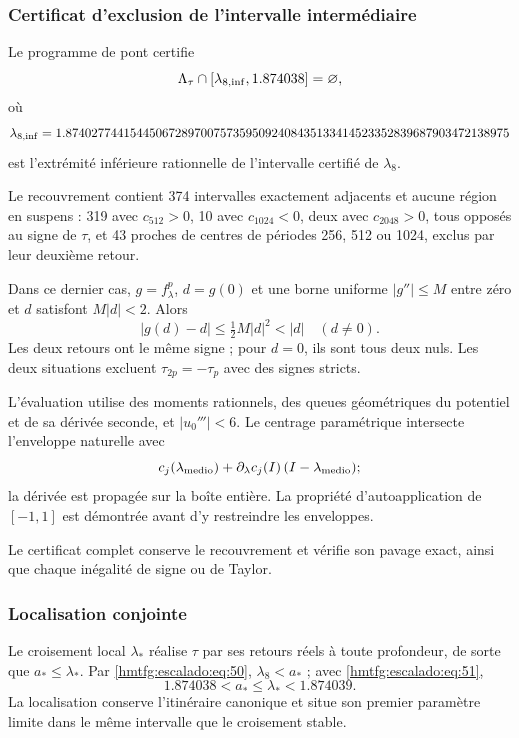 \subsubsection{Certificat d’exclusion de l’intervalle intermédiaire}
\label{hmtfg:escalado:15.3}

Le programme de pont certifie
\begin{equation}
\Lambda_\tau\cap[\lambda_{8,\rm inf},1.874038]=\varnothing,
\label{hmtfg:escalado:eq:51}
\end{equation}
où
\[
\lambda_{8,\rm inf}
=1.874027744154450672897007573595092408435133414523352839687903472138975
\]
est l’extrémité inférieure rationnelle de l’intervalle certifié de \(\lambda_8\).

Le recouvrement contient 374 intervalles exactement adjacents et aucune région en suspens : 319 avec \(c_{512}>0\), 10 avec \(c_{1024}<0\), deux avec \(c_{2048}>0\), tous opposés au signe de \(\tau\), et 43 proches de centres de périodes 256, 512 ou 1024, exclus par leur deuxième retour.

Dans ce dernier cas, \(g=f_\lambda^p\), \(d=g(0)\) et une borne uniforme \(|g''|\le M\) entre zéro et \(d\) satisfont \(M|d|<2\). Alors
\[
|g(d)-d|\le\tfrac12M|d|^2<|d|\quad(d\ne0).
\]
Les deux retours ont le même signe ; pour \(d=0\), ils sont tous deux nuls. Les deux situations excluent \(\tau_{2p}=-\tau_p\) avec des signes stricts.

L’évaluation utilise des moments rationnels, des queues géométriques du potentiel et de sa dérivée seconde, et \(|u_0'''|<6\). Le centrage paramétrique intersecte l’enveloppe naturelle avec
\[
c_j(\lambda_{\rm medio})+
\partial_\lambda c_j(I)\,(I-\lambda_{\rm medio});
\]
la dérivée est propagée sur la boîte entière. La propriété d’autoapplication de \([-1,1]\) est démontrée avant d’y restreindre les enveloppes.

Le certificat complet conserve le recouvrement et vérifie son pavage exact, ainsi que chaque inégalité de signe ou de Taylor.

\subsubsection{Localisation conjointe}
\label{hmtfg:escalado:15.4}

Le croisement local \(\lambda_*\) réalise \(\tau\) par ses retours réels à toute profondeur, de sorte que \(a_*\le\lambda_*\). Par \eqref{hmtfg:escalado:eq:50}, \(\lambda_8<a_*\) ; avec \eqref{hmtfg:escalado:eq:51},
\begin{equation}
\boxed{1.874038<a_*\le\lambda_*<1.874039.}
\label{hmtfg:escalado:eq:52}
\end{equation}
La localisation conserve l’itinéraire canonique et situe son premier paramètre limite dans le même intervalle que le croisement stable.

